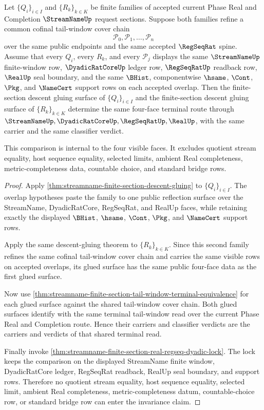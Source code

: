 \begin{theorem}
\label{thm:streamname-cofinal-tail-refinement-invariance}
Let $\{Q_i\}_{i \in I}$ and $\{R_k\}_{k \in K}$ be finite families of accepted
current Phase Real and Completion $\StreamNameUp$ request sections. Suppose
both families refine a common cofinal tail-window cover chain
$$
\mathcal P_0,\mathcal P_1,\ldots,\mathcal P_n
$$
over the same public endpoints and the same accepted $\RegSeqRat$ spine.
Assume that every $Q_i$, every $R_k$, and every $\mathcal P_j$ displays the
same $\StreamNameUp$ finite-window row, $\DyadicRatCoreUp$ ledger row,
$\RegSeqRatUp$ readback row, $\RealUp$ seal boundary, and the same $\BHist$,
componentwise $\hsame$, $\Cont$, $\Pkg$, and $\NameCert$ support rows on each
accepted overlap. Then the finite-section descent gluing surface of
$\{Q_i\}_{i \in I}$ and the finite-section descent gluing surface of
$\{R_k\}_{k \in K}$ determine the same four-face terminal route through
$\StreamNameUp,\DyadicRatCoreUp,\RegSeqRatUp,\RealUp$, with the same carrier
and the same classifier verdict.

This comparison is internal to the four visible faces. It excludes quotient
stream equality, host sequence equality, selected limits, ambient Real
completeness, metric-completeness data, countable choice, and standard bridge
rows.
\end{theorem}
\begin{proof}
Apply \autoref{thm:streamname-finite-section-descent-gluing} to
$\{Q_i\}_{i \in I}$. The overlap hypotheses paste the family to one public
reflection surface over the StreamName, DyadicRatCore, RegSeqRat, and RealUp
faces, while retaining exactly the displayed $\BHist$, $\hsame$, $\Cont$,
$\Pkg$, and $\NameCert$ support rows.

Apply the same descent-gluing theorem to $\{R_k\}_{k \in K}$. Since this second
family refines the same cofinal tail-window cover chain and carries the same
visible rows on accepted overlaps, its glued surface has the same public
four-face data as the first glued surface.

Now use
\autoref{thm:streamname-finite-section-tail-window-terminal-equivalence} for
each glued surface against the shared tail-window cover chain. Both glued
surfaces identify with the same terminal tail-window read over the current
Phase Real and Completion route. Hence their carriers and classifier verdicts
are the carriers and verdicts of that shared terminal read.

Finally invoke
\autoref{thm:streamname-finite-section-real-regseq-dyadic-lock}. The lock keeps
the comparison on the displayed StreamName finite window, DyadicRatCore ledger,
RegSeqRat readback, RealUp seal boundary, and support rows. Therefore no
quotient stream equality, host sequence equality, selected limit, ambient Real
completeness, metric-completeness datum, countable-choice row, or standard
bridge row can enter the invariance claim.
\end{proof}

